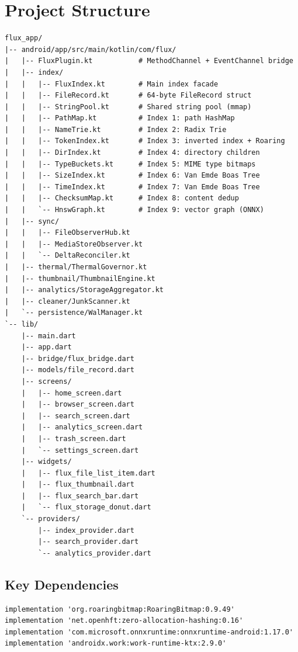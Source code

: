 \chapter{Project Structure}

\begin{lstlisting}[caption=Project Directory Tree]
flux_app/
|-- android/app/src/main/kotlin/com/flux/
|   |-- FluxPlugin.kt           # MethodChannel + EventChannel bridge
|   |-- index/
|   |   |-- FluxIndex.kt        # Main index facade
|   |   |-- FileRecord.kt       # 64-byte FileRecord struct
|   |   |-- StringPool.kt       # Shared string pool (mmap)
|   |   |-- PathMap.kt          # Index 1: path HashMap
|   |   |-- NameTrie.kt         # Index 2: Radix Trie
|   |   |-- TokenIndex.kt       # Index 3: inverted index + Roaring
|   |   |-- DirIndex.kt         # Index 4: directory children
|   |   |-- TypeBuckets.kt      # Index 5: MIME type bitmaps
|   |   |-- SizeIndex.kt        # Index 6: Van Emde Boas Tree
|   |   |-- TimeIndex.kt        # Index 7: Van Emde Boas Tree
|   |   |-- ChecksumMap.kt      # Index 8: content dedup
|   |   `-- HnswGraph.kt        # Index 9: vector graph (ONNX)
|   |-- sync/
|   |   |-- FileObserverHub.kt
|   |   |-- MediaStoreObserver.kt
|   |   `-- DeltaReconciler.kt
|   |-- thermal/ThermalGovernor.kt
|   |-- thumbnail/ThumbnailEngine.kt
|   |-- analytics/StorageAggregator.kt
|   |-- cleaner/JunkScanner.kt
|   `-- persistence/WalManager.kt
`-- lib/
    |-- main.dart
    |-- app.dart
    |-- bridge/flux_bridge.dart
    |-- models/file_record.dart
    |-- screens/
    |   |-- home_screen.dart
    |   |-- browser_screen.dart
    |   |-- search_screen.dart
    |   |-- analytics_screen.dart
    |   |-- trash_screen.dart
    |   `-- settings_screen.dart
    |-- widgets/
    |   |-- flux_file_list_item.dart
    |   |-- flux_thumbnail.dart
    |   |-- flux_search_bar.dart
    |   `-- flux_storage_donut.dart
    `-- providers/
        |-- index_provider.dart
        |-- search_provider.dart
        `-- analytics_provider.dart
\end{lstlisting}

\section{Key Dependencies}

\begin{lstlisting}[caption=Android dependencies (build.gradle)]
implementation 'org.roaringbitmap:RoaringBitmap:0.9.49'
implementation 'net.openhft:zero-allocation-hashing:0.16'
implementation 'com.microsoft.onnxruntime:onnxruntime-android:1.17.0'
implementation 'androidx.work:work-runtime-ktx:2.9.0'
\end{lstlisting}

